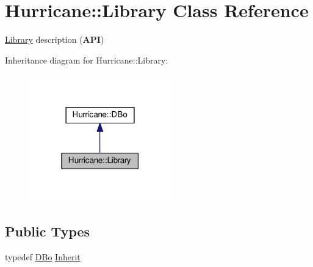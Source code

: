 \hypertarget{classHurricane_1_1Library}{}\section{Hurricane\+:\+:Library Class Reference}
\label{classHurricane_1_1Library}


\hyperlink{classHurricane_1_1Library}{Library} description ({\bfseries A\+PI})  




Inheritance diagram for Hurricane\+:\+:Library\+:\nopagebreak
\begin{figure}[H]
\begin{center}
\leavevmode
\includegraphics[width=174pt]{classHurricane_1_1Library__inherit__graph}
\end{center}
\end{figure}
\subsection*{Public Types}
\begin{DoxyCompactItemize}
\item 
typedef \hyperlink{classHurricane_1_1DBo}{D\+Bo} \hyperlink{classHurricane_1_1Library_a30ef446b2da0d405bdf4e11ce67b160f}{Inherit}
\end{DoxyCompactItemize}
